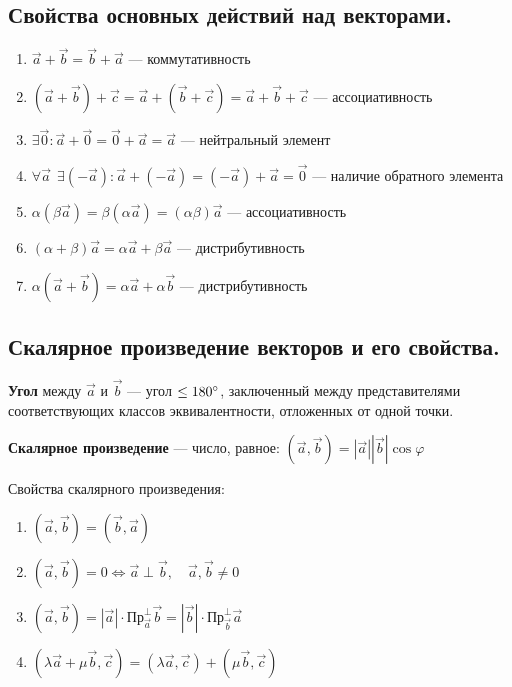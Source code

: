 \subsection{Свойства основных действий над векторами.}
\begin{enumerate}
    \item $\vec a + \vec b=\vec b + \vec a$ --- коммутативность
    \item $(\vec a + \vec b) + \vec c = \vec a + (\vec b + \vec c) = \vec a + \vec b + \vec c$ --- ассоциативность
    \item $\exists \vec 0 : \vec a + \vec 0 = \vec 0 + \vec a = \vec a$ --- нейтральный элемент
    \item $\forall \vec a \ \ \exists (-\vec a) : \vec a + (- \vec a) = (- \vec a) + \vec a = \vec 0$ --- наличие обратного элемента
    \item $\alpha(\beta\vec a) = \beta(\alpha \vec a) = (\alpha\beta)\vec a$ --- ассоциативность
    \item $(\alpha+\beta)\vec a = \alpha\vec a + \beta\vec a$ --- дистрибутивность
    \item $\alpha(\vec a + \vec b)=\alpha\vec a + \alpha\vec b$ --- дистрибутивность
\end{enumerate}

\subsection{Скалярное произведение векторов и его свойства.}
\begin{definition}
    \textbf{Угол} между $\vec a$ и $\vec b$ --- угол $\leq 180\degree$, заключенный между представителями соответствующих классов эквивалентности, отложенных от одной точки.
\end{definition}
\begin{definition}
    \textbf{Скалярное произведение} --- число, равное: $(\vec a, \vec b) = |\vec a||\vec b|\cos\varphi$
\end{definition}
Свойства скалярного произведения:
\begin{enumerate}
    \item $(\vec a, \vec b)=(\vec b, \vec a)$
    \item $(\vec a, \vec b)=0 \Leftrightarrow \vec a\perp\vec b,\quad \vec a,\vec b\not=0$
    \item $(\vec a, \vec b)=|\vec a|\cdot \text{Пр}_{\vec a}^{\perp} \vec b=|\vec b|\cdot \text{Пр}_{\vec b}^{\perp} \vec a$
    \item $(\lambda\vec a + \mu\vec b, \vec c)=(\lambda\vec a, \vec c)+(\mu\vec b, \vec c)$
\end{enumerate}
